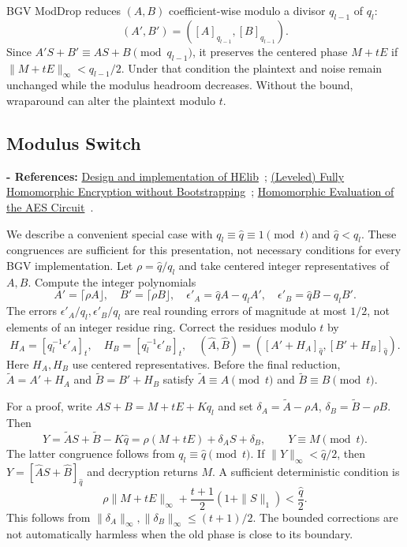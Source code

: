 BGV ModDrop reduces $(A,B)$ coefficient-wise modulo a divisor $q_{l-1}$ of $q_l$:
\[
(A',B')=([A]_{q_{l-1}},[B]_{q_{l-1}}).
\]
Since $A'S+B'\equiv AS+B\pmod{q_{l-1}}$, it preserves the centered phase $M+tE$ if $\|M+tE\|_\infty<q_{l-1}/2$. Under that condition the plaintext and noise remain unchanged while the modulus headroom decreases. Without the bound, wraparound can alter the plaintext modulo $t$.

\subsection{Modulus Switch}
\label{subsec:bgv-modulus-switch}

\noindent \textbf{- References:} \href{https://eprint.iacr.org/2020/1481}{Design and implementation of HElib}~\cite{bgv-modswitch1}; \href{https://eprint.iacr.org/2011/277.pdf}{(Leveled) Fully Homomorphic Encryption without Bootstrapping}~\cite{bgv-modswitch2}; \href{https://eprint.iacr.org/2012/099.pdf}{Homomorphic Evaluation of the AES Circuit}~\cite{bgv-modswitch3}.

We describe a convenient special case with $q_l\equiv\widehat q\equiv1\pmod t$ and $\widehat q<q_l$. These congruences are sufficient for this presentation, not necessary conditions for every BGV implementation. Let $\rho=\widehat q/q_l$ and take centered integer representatives of $A,B$. Compute the integer polynomials
\[
A'=\lceil\rho A\rfloor,\quad B'=\lceil\rho B\rfloor,\quad
\epsilon'_A=\widehat qA-q_lA',\quad\epsilon'_B=\widehat qB-q_lB'.
\]
The errors $\epsilon'_A/q_l,\epsilon'_B/q_l$ are real rounding errors of magnitude at most $1/2$, not elements of an integer residue ring. Correct the residues modulo $t$ by
\[
H_A=[q_l^{-1}\epsilon'_A]_t,\quad H_B=[q_l^{-1}\epsilon'_B]_t,
\quad (\widehat A,\widehat B)=([A'+H_A]_{\widehat q},[B'+H_B]_{\widehat q}).
\]
Here $H_A,H_B$ use centered representatives. Before the final reduction, $\widetilde A=A'+H_A$ and $\widetilde B=B'+H_B$ satisfy $\widetilde A\equiv A\pmod t$ and $\widetilde B\equiv B\pmod t$.

For a proof, write $AS+B=M+tE+Kq_l$ and set $\delta_A=\widetilde A-\rho A$, $\delta_B=\widetilde B-\rho B$. Then
\[
Y=\widetilde AS+\widetilde B-K\widehat q
=\rho(M+tE)+\delta_AS+\delta_B,
\qquad Y\equiv M\pmod t.
\]
The latter congruence follows from $q_l\equiv\widehat q\pmod t$. If $\|Y\|_\infty<\widehat q/2$, then $Y=[\widehat AS+\widehat B]_{\widehat q}$ and decryption returns $M$. A sufficient deterministic condition is
\[
\rho\|M+tE\|_\infty+\frac{t+1}{2}(1+\|S\|_1)<\frac{\widehat q}{2}.
\]
This follows from $\|\delta_A\|_\infty,\|\delta_B\|_\infty\leq(t+1)/2$. The bounded corrections are not automatically harmless when the old phase is close to its boundary.

